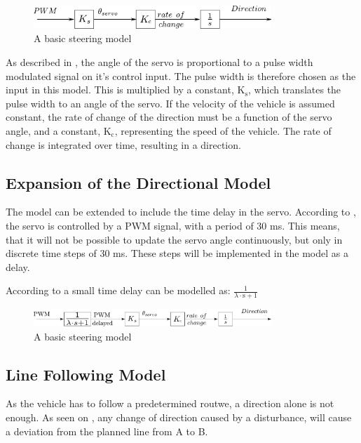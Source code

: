 \begin{figure}[H]
	\centering
	\includegraphics[width=0.8\textwidth]{figures/basicSteeringModel.pdf}
	\caption{A basic steering model}
	\label{basicSteering}
\end{figure}
 
As described in , the angle of the servo is proportional to a pulse width modulated signal on it's control input. The pulse width is therefore chosen as the input in this model. This is multiplied by a constant, $\text{K}_\text{s}$, which translates the pulse width to an angle of the servo.
If the velocity of the vehicle is assumed constant, the rate of change of the direction must be a function of the servo angle, and a constant, $\text{K}_\text{c}$, representing the speed of the vehicle.
The rate of change is integrated over time, resulting in a direction. 

\subsection{Expansion of the Directional Model}

The model can be extended to include the time delay in the servo. According to , the servo is controlled by a PWM signal, with a period of 30 ms. This means, that it will not be possible to update the servo angle continuously, but only in discrete time steps of 30 ms. These steps will be implemented in the model as a delay.



According to  a small time delay can be modelled as:
$\frac{1}{\lambda\cdot\text{s}+1}$ 

\begin{figure}[H]
	\centering
	\includegraphics[width=0.8\textwidth]{figures/basicSteeringModelWithDelay.pdf}
	\caption{A basic steering model}
	\label{basicSteeringWithDelay}
\end{figure}

\subsection{Line Following Model}
As the vehicle has to follow a predetermined routwe, a direction alone is not enough. As seen on , any change of direction caused by a disturbance, will cause a deviation from the planned line from A to B.

